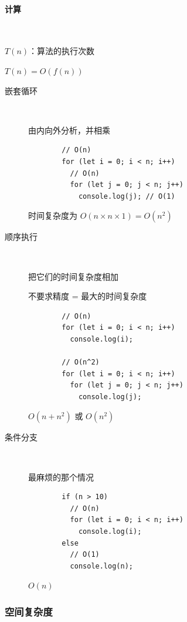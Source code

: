 \documentclass[11pt,journal,compsoc]{IEEEtran}
\begin{document}
\paragraph{计算} ~

$T(n)$：算法的执行次数

$T(n) = O(f(n))$

\begin{description}
    \item[嵌套循环] ~

    由内向外分析，并相乘

    \begin{verbatim}
        // O(n)
        for (let i = 0; i < n; i++)
          // O(n)
          for (let j = 0; j < n; j++)
            console.log(j); // O(1)
    \end{verbatim}

    时间复杂度为 $O(n \times n \times 1) = O(n^2)$

    \item[顺序执行] ~

    把它们的时间复杂度相加
    
    不要求精度 = 最大的时间复杂度

    \begin{verbatim}
        // O(n)
        for (let i = 0; i < n; i++)
          console.log(i);

        // O(n^2)
        for (let i = 0; i < n; i++)
          for (let j = 0; j < n; j++)
            console.log(j);
    \end{verbatim}

     $O(n + n^2)$ 或 $O(n^2)$

    \item[条件分支] ~

    最麻烦的那个情况

    \begin{verbatim}
        if (n > 10)
          // O(n)
          for (let i = 0; i < n; i++)
            console.log(i);
        else
          // O(1)
          console.log(n);
    \end{verbatim}

    $O(n)$
\end{description}


\subsubsection{空间复杂度}
\end{document}
